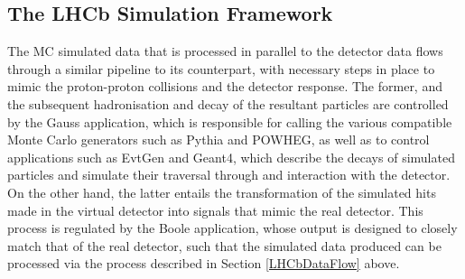 \subsection{The LHCb Simulation Framework}
The MC simulated data that is processed in parallel to the detector data flows through a similar pipeline to its counterpart, with necessary steps in place to mimic the proton-proton collisions and the detector response. The former, and the subsequent hadronisation and decay of the resultant particles 
are controlled by the Gauss application, which is responsible for calling the various compatible Monte Carlo generators such as Pythia and POWHEG, as well as to control applications such as EvtGen and Geant4, which describe the decays of simulated particles and simulate their traversal through and interaction with
the detector. On the other hand, the latter entails the transformation of the simulated hits made in the virtual detector into signals that mimic the real detector. This process is regulated by the Boole application, whose output is designed to closely match that of the real detector, such that the simulated data produced can be 
processed via the process described in Section \ref{LHCbDataFlow} above. 
